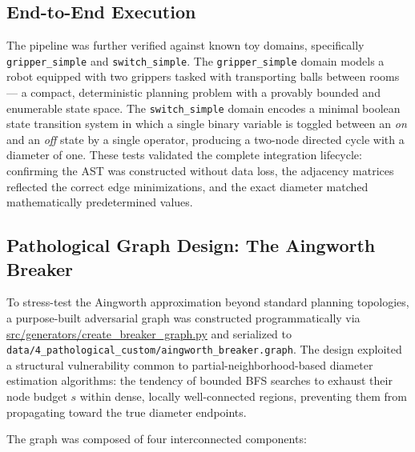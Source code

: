 \subsection{End-to-End Execution}
The pipeline was further verified against known toy domains, specifically \texttt{gripper\_simple} and \texttt{switch\_simple}. The \texttt{gripper\_simple} domain models a robot equipped with two grippers tasked with transporting balls between rooms — a compact, deterministic planning problem with a provably bounded and enumerable state space. The \texttt{switch\_simple} domain encodes a minimal boolean state transition system in which a single binary variable is toggled between an \textit{on} and an \textit{off} state by a single operator, producing a two-node directed cycle with a diameter of one. These tests validated the complete integration lifecycle: confirming the AST was constructed without data loss, the adjacency matrices reflected the correct edge minimizations, and the exact diameter matched mathematically predetermined values.

\subsection{Pathological Graph Design: The Aingworth Breaker}
\label{subsec:breaker}
To stress-test the Aingworth approximation beyond standard planning topologies, a purpose-built adversarial graph was constructed programmatically via \url{src/generators/create_breaker_graph.py} and serialized to \texttt{data/4\_pathological\_custom/aingworth\_breaker.graph}. The design exploited a structural vulnerability common to partial-neighborhood-based diameter estimation algorithms: the tendency of bounded BFS searches to exhaust their node budget $s$ within dense, locally well-connected regions, preventing them from propagating toward the true diameter endpoints.
 
The graph was composed of four interconnected components:
 
